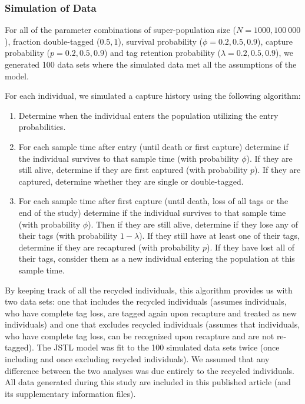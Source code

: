 \documentclass[12pt]{article}
\begin{document}
\subsubsection{Simulation of Data}\label{simulation-of-data}

For all of the parameter combinations of super-population size
(\(N=1 000, 100 \ 000\)), fraction double-tagged (\(0.5, 1\)), survival
probability (\(\phi=0.2,0.5,0.9\)), capture probability
(\(p=0.2,0.5,0.9\)) and tag retention probability
(\(\lambda=0.2,0.5,0.9\)), we generated 100 data sets where the
simulated data met all the assumptions of the model.

For each individual, we simulated a capture history using the following
algorithm:

\begin{enumerate}
\def\labelenumi{\arabic{enumi}.}
\item
  Determine when the individual enters the population utilizing the
  entry probabilities.
\item
  For each sample time after entry (until death or first capture) 
  determine if the individual survives to that sample time (with
  probability \(\phi\)). If they are still alive, determine if they are
  first captured (with probability \(p\)). If they are captured,
  determine whether they are single or double-tagged.
\item
  For each sample time after first capture (until death, loss of all
  tags or the end of the study) determine if the individual survives to
  that sample time (with probability \(\phi\)). Then if they are still
  alive, determine if they lose any of their tags (with probability
  \(1-\lambda\)). If they still have at least one of their tags,
  determine if they are recaptured (with probability \(p\)). If they
  have lost all of their tags, consider them as a new individual
  entering the population at this sample time.
\end{enumerate}

By keeping track of all the recycled individuals, this algorithm 
provides us with two data sets: one that includes the recycled
individuals (assumes individuals, who have complete tag loss, are tagged
again upon recapture and treated as new individuals) and one that
excludes recycled individuals (assumes that individuals, who
have complete tag loss, can be recognized upon recapture and are not
re-tagged). The JSTL model was fit to the 100 simulated data sets twice
(once including and once excluding recycled individuals). We assumed that any
difference between the two analyses was due entirely to the recycled
individuals. All data generated during this study are included in this published article (and its supplementary information files).
\end{document}
